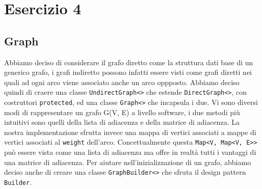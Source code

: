 \documentclass[12pt, letterpaper]{report}
\begin{document}
\chapter*{Esercizio 4}
\section{Graph}
Abbiamo deciso di considerare il grafo diretto come la struttura dati base di un 
generico grafo, i grafi indiretto possono infatti essere visti come grafi diretti 
nei quali ad ogni arco viene associato anche un arco oppposto. Abbiamo deciso quindi 
di craere una classe \verb|UndirectGraph<>| che estende \verb|DirectGraph<>|, con 
costruttori \verb|protected|, ed una classe \verb|Graph<>| che incapsula i due.
\newline
\newline
Vi sono diversi modi di rappresentare un grafo G(V, E) a livello software, i due metodi 
più intuitivi sono quelli della lista di adiacenza e della matrice di adiacenza.
La nostra implementazione sfrutta invece una mappa di vertici associati a mappe di 
vertici associati al \verb|weight| dell'arco. 
\newline
Concettualmente questa \verb|Map<V, Map<V, E>>| può essere vista come una lista di 
adiacenza ma offre in realtà tutti i vantaggi di una matrice di adiacenza.
\newline
\newline
Per aiutare nell'inizializzazione di un grafo, abbiamo deciso anche di creare una 
classe \verb|GraphBuilder<>| che sfruta il design pattern \verb|Builder|.
\end{document}
